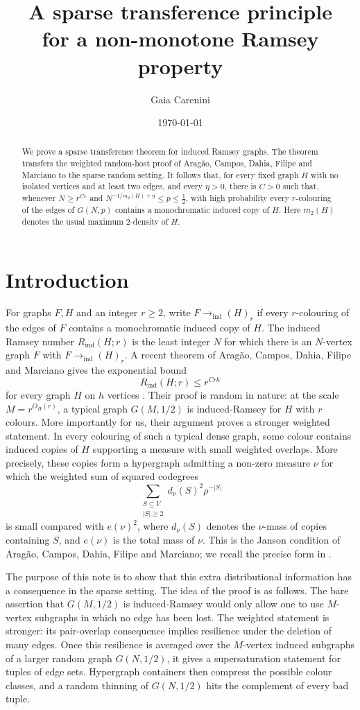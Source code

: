 \documentclass[11pt,reqno]{amsart}
\title[A sparse transference principle for a non-monotone Ramsey property]{A sparse transference principle \\for a non-monotone Ramsey property}
\author[G. Carenini]{Gaia Carenini}
\date{\today}
\numberwithin{equation}{section}
\theoremstyle{plain}
\theoremstyle{definition}
\newcommand{\ind}{\mathrm{ind}}
\begin{document}
\begin{abstract}
We prove a sparse transference theorem for induced Ramsey graphs.  The theorem
transfers the weighted random-host proof of Arag\~ao, Campos, Dahia, Filipe
and Marciano to the sparse random setting.  It follows that, for every fixed
graph $H$ with no isolated vertices and at least two edges, and every
$\eta>0$, there is $C>0$ such that, whenever
$N\ge r^{Cr}$ and $N^{-1/m_2(H)+\eta}\le p\le \frac12$, with high probability every $r$-colouring of the edges of $G(N,p)$ contains
a monochromatic induced copy of $H$.  Here $m_2(H)$ denotes the usual
maximum 2-density of $H$.
\end{abstract}

\maketitle
\vspace{-0.8cm}
\section{Introduction}
For graphs $F,H$ and an integer $r\ge2$, write $ F\longrightarrow_{\ind}(H)_r$ if every $r$-colouring of the edges of $F$ contains a monochromatic
induced copy of $H$.  The induced Ramsey number $R_{\ind}(H;r)$ is the
least integer $N$ for which there is an $N$-vertex graph $F$ with
$F\to_{\ind}(H)_r$.  A recent theorem of Arag\~ao, Campos, Dahia, Filipe and
Marciano gives the exponential bound
$$
        R_{\ind}(H;r)\le r^{Crh}
$$
for every graph $H$ on $h$ vertices \cite{ACDFM}.  Their proof is random in
nature: at the scale $M=r^{O_H(r)}$, a typical graph $G(M,1/2)$ is
induced-Ramsey for $H$ with $r$ colours.  More importantly for us, their
argument proves a stronger weighted statement.  In every colouring of such a
typical dense graph, some colour contains induced copies of $H$ supporting a
measure with small weighted overlaps. More precisely, these copies form a hypergraph admitting a non-zero measure
$\nu$ for which the weighted sum of squared codegrees
$$
        \sum_{\substack{S\subseteq V\\ |S|\ge2}}
        d_\nu(S)^2\rho^{-|S|}
$$
is small compared with $e(\nu)^2$, where $d_\nu(S)$ denotes the
$\nu$-mass of copies containing $S$, and $e(\nu)$ is the total mass of
$\nu$.  This is the Janson condition of Arag\~ao, Campos, Dahia, Filipe and
Marciano; we recall the precise form in .

The purpose of this note is to show that this extra distributional information
has a consequence in the sparse setting.  The idea of the proof is as follows.  The bare
assertion that $G(M,1/2)$ is induced-Ramsey would only allow one to use
$M$-vertex subgraphs in which no edge has been lost.  The weighted statement
is stronger: its pair-overlap consequence implies resilience under the deletion
of many edges.  Once this resilience is averaged over the $M$-vertex induced
subgraphs of a larger random graph $G(N,1/2)$, it gives a supersaturation
statement for tuples of edge sets.  Hypergraph containers then compress the
possible colour classes, and a random thinning of $G(N,1/2)$ hits the
complement of every bad tuple.
\end{document}
